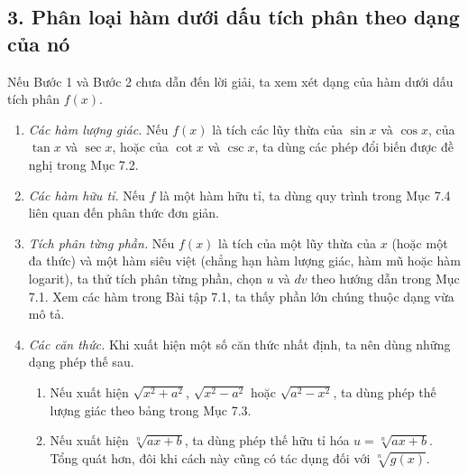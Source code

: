 \documentclass[12pt,a4paper]{article}
\begin{document}
\subsection*{3. Phân loại hàm dưới dấu tích phân theo dạng của nó}
Nếu Bước 1 và Bước 2 chưa dẫn đến lời giải, ta xem xét dạng của hàm dưới dấu tích phân $f(x)$.
\begin{enumerate}[label=(\alph*),leftmargin=2em]
\item \textit{Các hàm lượng giác.} Nếu $f(x)$ là tích các lũy thừa của $\sin x$ và $\cos x$, của $\tan x$ và $\sec x$, hoặc của $\cot x$ và $\csc x$, ta dùng các phép đổi biến được đề nghị trong Mục 7.2.
\item \textit{Các hàm hữu tỉ.} Nếu $f$ là một hàm hữu tỉ, ta dùng quy trình trong Mục 7.4 liên quan đến phân thức đơn giản.
\item \textit{Tích phân từng phần.} Nếu $f(x)$ là tích của một lũy thừa của $x$ (hoặc một đa thức) và một hàm siêu việt (chẳng hạn hàm lượng giác, hàm mũ hoặc hàm logarit), ta thử tích phân từng phần, chọn $u$ và $dv$ theo hướng dẫn trong Mục 7.1. Xem các hàm trong Bài tập 7.1, ta thấy phần lớn chúng thuộc dạng vừa mô tả.
\item \textit{Các căn thức.} Khi xuất hiện một số căn thức nhất định, ta nên dùng những dạng phép thế sau.
\begin{enumerate}[label=(\roman*),leftmargin=2em]
\item Nếu xuất hiện $\sqrt{x^2+a^2}$, $\sqrt{x^2-a^2}$ hoặc $\sqrt{a^2-x^2}$, ta dùng phép thế lượng giác theo bảng trong Mục 7.3.
\item Nếu xuất hiện $\sqrt[n]{ax+b}$, ta dùng phép thế hữu tỉ hóa $u=\sqrt[n]{ax+b}$. Tổng quát hơn, đôi khi cách này cũng có tác dụng đối với $\sqrt[n]{g(x)}$.
\end{enumerate}
\end{enumerate}
\end{document}
